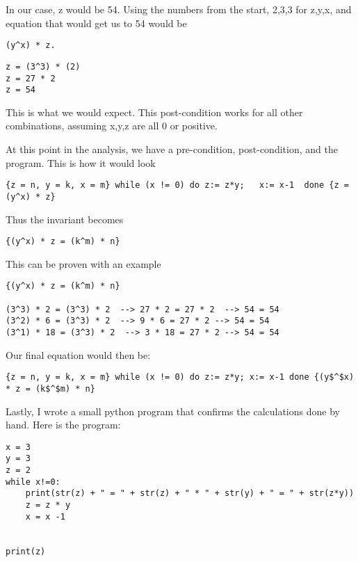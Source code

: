 \documentclass{article}
\theoremstyle{theorem}
\theoremstyle{definition}
\theoremstyle{remark}
\begin{document}
\noindent In our case, z would be 54. Using the numbers from the start, 2,3,3 for z,y,x, and equation that would get us to 54 would be 
\begin{verbatim}
(y^x) * z. 
\end{verbatim}

\begin{verbatim}
z = (3^3) * (2)
z = 27 * 2
z = 54
\end{verbatim}

\noindent This is what we would expect. This post-condition works for all other combinations, assuming x,y,z are all 0 or positive.

\noindent\newline\newline At this point in the analysis, we have a pre-condition, post-condition, and the program. This is how it would look
\begin{verbatim}
{z = n, y = k, x = m} while (x != 0) do z:= z*y;   x:= x-1  done {z = (y^x) * z}
\end{verbatim}

\noindent\newline\newline Thus the invariant becomes
\begin{verbatim}
{(y^x) * z = (k^m) * n}
\end{verbatim}

\noindent\newline\newline This can be proven with an example

\begin{verbatim}
{(y^x) * z = (k^m) * n}

(3^3) * 2 = (3^3) * 2  --> 27 * 2 = 27 * 2  --> 54 = 54
(3^2) * 6 = (3^3) * 2  --> 9 * 6 = 27 * 2 --> 54 = 54
(3^1) * 18 = (3^3) * 2  --> 3 * 18 = 27 * 2 --> 54 = 54

\end{verbatim}

\noindent\newline\newline Our final equation would then be:
\begin{verbatim}
{z = n, y = k, x = m} while (x != 0) do z:= z*y; x:= x-1 done {(y$^$x) * z = (k$^$m) * n}
\end{verbatim}

\noindent\newline\newline Lastly, I wrote a small python program that confirms the calculations done by hand. Here is the program:
\begin{verbatim}
x = 3
y = 3
z = 2
while x!=0:
    print(str(z) + " = " + str(z) + " * " + str(y) + " = " + str(z*y))
    z = z * y
    x = x -1


print(z)
\end{verbatim}
\end{document}
